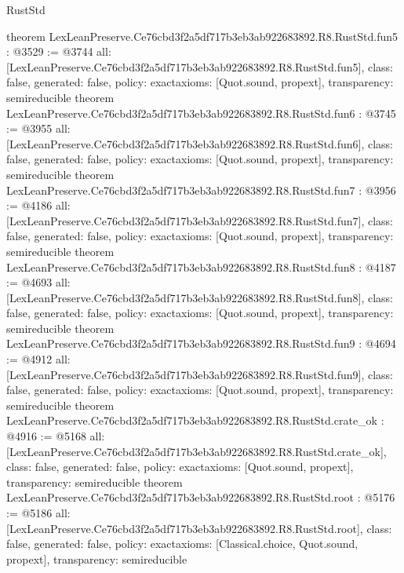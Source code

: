 \begin{lexlean}{RustStd}
\begin{coremodule}
{}
theorem LexLeanPreserve.Ce76cbd3f2a5df717b3eb3ab922683892.R8.RustStd.fun5 : @3529 := @3744 {
  all: [LexLeanPreserve.Ce76cbd3f2a5df717b3eb3ab922683892.R8.RustStd.fun5],
  class: false,
  generated: false,
  policy: exact{axioms: [Quot.sound, propext]},
  transparency: semireducible
}
theorem LexLeanPreserve.Ce76cbd3f2a5df717b3eb3ab922683892.R8.RustStd.fun6 : @3745 := @3955 {
  all: [LexLeanPreserve.Ce76cbd3f2a5df717b3eb3ab922683892.R8.RustStd.fun6],
  class: false,
  generated: false,
  policy: exact{axioms: [Quot.sound, propext]},
  transparency: semireducible
}
theorem LexLeanPreserve.Ce76cbd3f2a5df717b3eb3ab922683892.R8.RustStd.fun7 : @3956 := @4186 {
  all: [LexLeanPreserve.Ce76cbd3f2a5df717b3eb3ab922683892.R8.RustStd.fun7],
  class: false,
  generated: false,
  policy: exact{axioms: [Quot.sound, propext]},
  transparency: semireducible
}
theorem LexLeanPreserve.Ce76cbd3f2a5df717b3eb3ab922683892.R8.RustStd.fun8 : @4187 := @4693 {
  all: [LexLeanPreserve.Ce76cbd3f2a5df717b3eb3ab922683892.R8.RustStd.fun8],
  class: false,
  generated: false,
  policy: exact{axioms: [Quot.sound, propext]},
  transparency: semireducible
}
theorem LexLeanPreserve.Ce76cbd3f2a5df717b3eb3ab922683892.R8.RustStd.fun9 : @4694 := @4912 {
  all: [LexLeanPreserve.Ce76cbd3f2a5df717b3eb3ab922683892.R8.RustStd.fun9],
  class: false,
  generated: false,
  policy: exact{axioms: [Quot.sound, propext]},
  transparency: semireducible
}
theorem LexLeanPreserve.Ce76cbd3f2a5df717b3eb3ab922683892.R8.RustStd.crate_ok : @4916 := @5168 {
  all: [LexLeanPreserve.Ce76cbd3f2a5df717b3eb3ab922683892.R8.RustStd.crate_ok],
  class: false,
  generated: false,
  policy: exact{axioms: [Quot.sound, propext]},
  transparency: semireducible
}
theorem LexLeanPreserve.Ce76cbd3f2a5df717b3eb3ab922683892.R8.RustStd.root : @5176 := @5186 {
  all: [LexLeanPreserve.Ce76cbd3f2a5df717b3eb3ab922683892.R8.RustStd.root],
  class: false,
  generated: false,
  policy: exact{axioms: [Classical.choice, Quot.sound, propext]},
  transparency: semireducible
}


\end{coremodule}
\end{lexlean}
